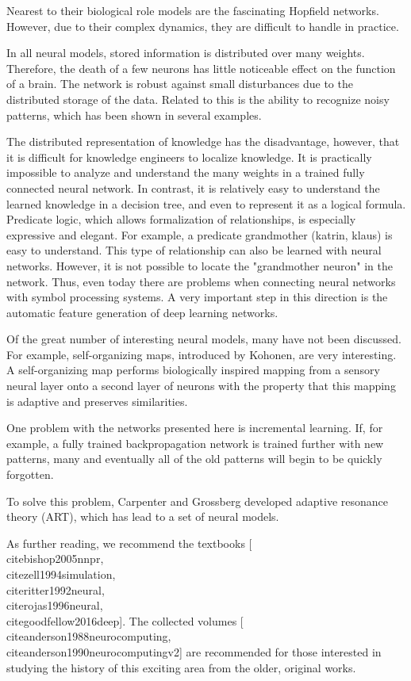 \documentclass[10pt]{book}
\begin{document}
Nearest to their biological role models are the fascinating Hopfield networks. However, due to their complex dynamics, they are difficult to handle in practice.

In all neural models, stored information is distributed over many weights. Therefore, the death of a few neurons has little noticeable effect on the function of a brain. The network is robust against small disturbances due to the distributed storage of the data. Related to this is the ability to recognize noisy patterns, which has been shown in several examples.

The distributed representation of knowledge has the disadvantage, however, that it is difficult for knowledge engineers to localize knowledge. It is practically impossible to analyze and understand the many weights in a trained fully connected neural network. In contrast, it is relatively easy to understand the learned knowledge in a decision tree, and even to represent it as a logical formula. Predicate logic, which allows formalization of relationships, is especially expressive and elegant. For example, a predicate grandmother (katrin, klaus) is easy to understand. This type of relationship can also be learned with neural networks. However, it is not possible to locate the "grandmother neuron" in the network. Thus, even today there are problems when connecting neural networks with symbol processing systems. A very important step in this direction is the automatic feature generation of deep learning networks.

Of the great number of interesting neural models, many have not been discussed. For example, self-organizing maps, introduced by Kohonen, are very interesting. A self-organizing map performs biologically inspired mapping from a sensory neural layer onto a second layer of neurons with the property that this mapping is adaptive and preserves similarities.

One problem with the networks presented here is incremental learning. If, for example, a fully trained backpropagation network is trained further with new patterns, many and eventually all of the old patterns will begin to be quickly forgotten.

To solve this problem, Carpenter and Grossberg developed adaptive resonance theory (ART), which has lead to a set of neural models.


As further reading, we recommend the textbooks [\\cite{bishop2005nnpr}, \\cite{zell1994simulation}, \\cite{ritter1992neural}, \\cite{rojas1996neural}, \\cite{goodfellow2016deep}]. The collected volumes [\\cite{anderson1988neurocomputing}, \\cite{anderson1990neurocomputingv2}] are recommended for those interested in studying the history of this exciting area from the older, original works.
\end{document}
